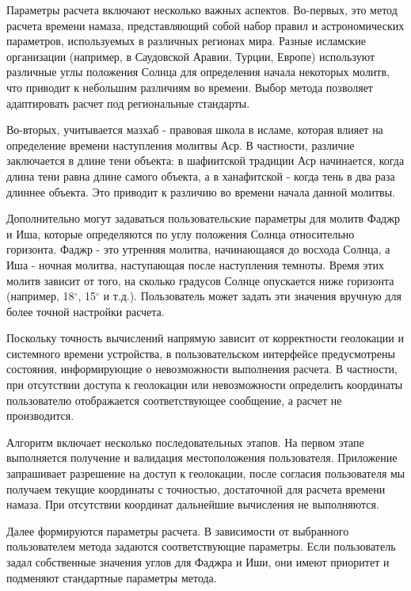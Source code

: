 Параметры расчета включают несколько важных аспектов. Во-первых, это метод расчета времени намаза, представляющий собой набор правил и астрономических параметров, используемых в различных регионах мира. Разные исламские организации (например, в Саудовской Аравии, Турции, Европе) используют различные углы положения Солнца для определения начала некоторых молитв, что приводит к небольшим различиям во времени. Выбор метода позволяет адаптировать расчет под региональные стандарты.


Во-вторых, учитывается мазхаб - правовая школа в исламе, которая влияет на определение времени наступления молитвы Аср. В частности, различие заключается в длине тени объекта: в шафиитской традиции Аср начинается, когда длина тени равна длине самого объекта, а в ханафитской - когда тень в два раза длиннее объекта. Это приводит к различию во времени начала данной молитвы.


Дополнительно могут задаваться пользовательские параметры для молитв Фаджр и Иша, которые определяются по углу положения Солнца относительно горизонта. Фаджр - это утренняя молитва, начинающаяся до восхода Солнца, а Иша - ночная молитва, наступающая после наступления темноты. Время этих молитв зависит от того, на сколько градусов Солнце опускается ниже горизонта (например, 18$^{\circ}$, 15$^{\circ}$ и т.д.). Пользователь может задать эти значения вручную для более точной настройки расчета.


Поскольку точность вычислений напрямую зависит от корректности геолокации и системного времени устройства, в пользовательском интерфейсе предусмотрены состояния, информирующие о невозможности выполнения расчета. В частности, при отсутствии доступа к геолокации или невозможности определить координаты пользователю отображается соответствующее сообщение, а расчет не производится.


Алгоритм включает несколько последовательных этапов. На первом этапе выполняется получение и валидация местоположения пользователя. Приложение запрашивает разрешение на доступ к геолокации, после согласия пользователя мы получаем текущие координаты с точностью, достаточной для расчета времени намаза. При отсутствии координат дальнейшие вычисления не выполняются.


Далее формируются параметры расчета. В зависимости от выбранного пользователем метода задаются соответствующие параметры. Если пользователь задал собственные значения углов для Фаджра и Иши, они имеют приоритет и подменяют стандартные параметры метода.


